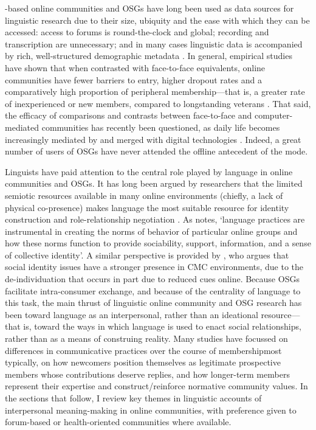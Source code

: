 \hyp{}based online communities and \glspl{OSG} have long been used as data sources for linguistic research due to their size, ubiquity and the ease with which they can be accessed: access to \glspl{forum} is round\hyp{}the\hyp{}clock and global; recording and transcription are unnecessary; and in many cases linguistic data is accompanied by rich, well\hyp{}structured demographic metadata \cite{leech_new_2006}. In general, empirical studies have shown that when contrasted with face\hyp{}to\hyp{}face equivalents, online communities have fewer barriers to entry, higher dropout rates and a comparatively high proportion of peripheral membership---that is, a greater rate of inexperienced or new members, compared to longstanding veterans \cite{sandaunet_challenge_2008,zhang_peripheral_2001}. That said, the efficacy of comparisons and contrasts between face\hyp{}to\hyp{}face and computer\hyp{}mediated communities has recently been questioned, as daily life becomes increasingly mediated by and merged with digital technologies \cite{wu_is_2013}. Indeed, a great number of users of \glspl{OSG} have never attended the offline antecedent of the \gls{mode}.

Linguists have paid attention to the central role played by language in online communities and \glspl{OSG}. It has long been argued by researchers that the limited semiotic resources available in many online environments (chiefly, a lack of physical co\hyp{}presence) makes language the most suitable resource for identity construction and role\hyp{}relationship negotiation \cite{thorne_computer-mediated_2008}. As \textcite[p.~303]{lam_language_2008} notes, `language practices are instrumental in creating the norms of behavior of particular online groups and how these norms function to provide sociability, support, information, and a sense of collective identity'. A similar perspective is provided by \textcite{postmes_formation_2000}, who argues that social identity issues have a stronger presence in \gls{CMC} environments, due to the de\hyp{}individuation that occurs in part due to reduced cues online. Because \glspl{OSG} facilitate intra\hyp{}consumer exchange, and because of the centrality of language to this task, the main thrust of linguistic online community and \gls{OSG} research has been toward language as an interpersonal, rather than an ideational resource---that is, toward the ways in which language is used to enact social relationships, rather than as a means of construing reality. Many studies have focussed on differences in communicative practices over the course of membership\textemdash{}most typically, on how newcomers position themselves as legitimate prospective members whose contributions deserve replies, and how longer\hyp{}term members represent their expertise and construct\slash reinforce normative community values. In the sections that follow, I review key \glspl{theme} in linguistic accounts of interpersonal meaning\hyp{}making in online communities, with preference given to \gls{forum}\hyp{}based or health\hyp{}oriented communities where available.


